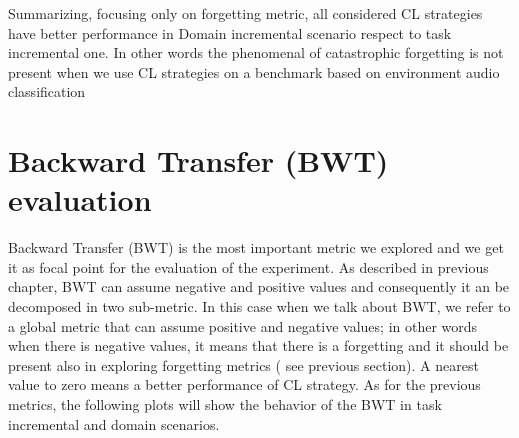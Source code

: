 \documentclass[english, LaM, oneside]{sapthesis}%
\begin{document}
Summarizing, focusing only on forgetting metric, all considered CL strategies have better performance in Domain incremental scenario respect to task incremental one. In other words the phenomenal of catastrophic forgetting is not present when we use CL strategies on a benchmark based on environment audio classification


\section{Backward Transfer (BWT) evaluation}
Backward Transfer (BWT) is the most important metric we explored and we get it as focal point for the evaluation of the experiment.
As described in previous chapter, BWT can assume negative and positive values and consequently it an be decomposed in two sub-metric. In this case when we talk about BWT, we refer to a global metric that can assume positive and negative values; in other words when there is negative values, it means that there is a forgetting and it should be present also in exploring forgetting metrics ( see previous section). A nearest value to zero means a better performance of CL strategy. As for the previous metrics, the following plots will show the behavior of the BWT in task incremental and domain scenarios.
\end{document}
